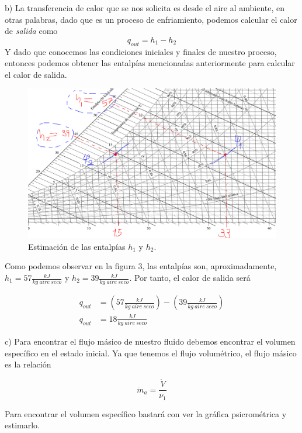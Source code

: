 \documentclass[12pt, letterpaper]{article}
\begin{document}
b) La transferencia de calor que se nos solicita es desde el aire al ambiente, en otras palabras, dado que es un proceso de enfriamiento, podemos calcular el calor de \textit{salida} como
\begin{equation}
	q_{out} = h_1 - h_2
\end{equation}
Y dado que conocemos las condiciones iniciales y finales de nuestro proceso, entonces podemos obtener las entalpías mencionadas anteriormente para calcular el calor de salida.
\begin{figure}[H]
	\centering
	\includegraphics[width=\textwidth]{3.png}
	\caption{Estimación de las entalpías $h_1$ y $h_2$.}
\end{figure}
Como podemos observar en la figura 3, las entalpías son, aproximadamente, $h_1 = 57 \frac{kJ}{kg\ aire\ seco}$ y $h_2 = 39 \frac{kJ}{kg\ aire\ seco}$. Por tanto, el calor de salida será

\begin{equation}
	\boxed{\begin{split}
		q_{out} &= (57 \frac{kJ}{kg\ aire\ seco}) - (39 \frac{kJ}{kg\ aire\ seco})\\
		q_{out} &= 18 \frac{kJ}{kg\ aire\ seco}
	\end{split}}
\end{equation}

c) Para encontrar el flujo másico de nuestro fluido debemos encontrar el volumen específico en el estado inicial. Ya que tenemos el flujo volumétrico, el flujo másico es la relación

\begin{equation}
	\dot m_a = \frac{\dot V}{\nu_1}
\end{equation}

Para encontrar el volumen específico bastará con ver la gráfica psicrométrica y estimarlo.
\end{document}
